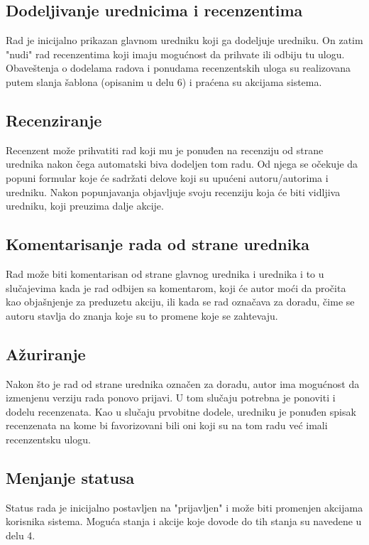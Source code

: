 \documentclass[a4paper,14,4pt]{article}
\begin{document}
\subsection{Dodeljivanje urednicima i recenzentima}
Rad je inicijalno prikazan glavnom uredniku koji ga dodeljuje uredniku. On zatim "nudi" rad recenzentima koji imaju mogućnost da prihvate ili odbiju tu ulogu. Obaveštenja o dodelama radova i ponudama recenzentskih uloga su realizovana putem slanja šablona (opisanim u delu 6) i praćena su akcijama sistema.
\subsection{Recenziranje}
Recenzent može prihvatiti rad koji mu je ponuđen na recenziju od strane urednika nakon čega automatski biva dodeljen tom radu. Od njega se očekuje da popuni formular koje će sadržati delove koji su upućeni autoru/autorima i uredniku. Nakon popunjavanja objavljuje svoju recenziju koja će biti vidljiva uredniku, koji preuzima dalje akcije.
\subsection{Komentarisanje rada od strane urednika}
Rad može biti komentarisan od strane glavnog urednika i urednika i to u slučajevima kada je rad odbijen sa komentarom, koji će autor moći da pročita kao objašnjenje za preduzetu akciju, ili kada se rad označava za doradu, čime se autoru stavlja do znanja koje su to promene koje se zahtevaju.
\subsection{Ažuriranje}
Nakon što je rad od strane urednika označen za doradu, autor ima mogućnost da izmenjenu verziju rada ponovo prijavi. U tom slučaju potrebna je ponoviti i dodelu recenzenata. Kao u slučaju prvobitne dodele, uredniku je ponuđen spisak recenzenata na kome bi favorizovani bili oni koji su na tom radu već imali recenzentsku ulogu.
\subsection{Menjanje statusa}
Status rada je inicijalno postavljen na "prijavljen" i može biti promenjen akcijama korisnika sistema. Moguća stanja i akcije koje dovode do tih stanja su navedene u delu 4.
\end{document}

